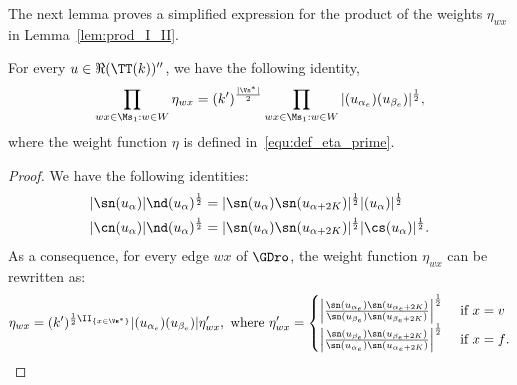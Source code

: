 \documentclass[a4paper,twoside,11pt]{article}
\begin{document}
The next lemma proves a simplified expression for the product of the weights $\eta_{w x}$ in Lemma~\ref{lem:prod_I_II}.
\begin{lem}\label{lem:simplified}
For every $u\in\Re(\TT(k))''$, we have the following identity,
\begin{equation*}
\prod_{wx\in\Ms_1:w\in W}\eta_{w x}=(k')^{\frac{|\Vs^*|}{2}}\prod_{wx\in\Ms_1:w\in W}|\sc(u_{\alpha_e})\sc(u_{\beta_e})|^{\frac{1}{2}},
\end{equation*}
where the weight function $\eta$ is defined in~\eqref{equ:def_eta_prime}.
\end{lem}
\begin{proof}
We have the following identities:
\begin{align*}
|\sn(u_{\alpha})|\nd(u_{\alpha})^{\frac{1}{2}}&=|\sn(u_{\alpha})\sn(u_{\alpha+2K})|^\frac{1}{2} |\sc(u_{\alpha})|^\frac{1}{2}\\
|\cn(u_{\alpha})|\nd(u_{\alpha})^{\frac{1}{2}}&=|\sn(u_{\alpha})\sn(u_{\alpha+2K})|^\frac{1}{2}|\cs(u_{\alpha})|^\frac{1}{2}.
\end{align*}
As a consequence, for every edge $wx$ of $\GDro$, the weight function $\eta_{w x}$ can be rewritten as:
\begin{equation*}
\eta_{wx}=(k')^{\frac{1}{2}\II_{\{x\in \Vs^*\}}}|\sc(u_{\alpha_e})\sc(u_{\beta_e})|\eta'_{w x}, 
\text{ where } \eta'_{w x}=
\begin{cases}
\left|\frac{\sn(u_{\alpha_e})\sn(u_{\alpha_e+2K})}{\sn(u_{\beta_e})\sn(u_{\beta_e+2K})}\right|^{\frac{1}{2}}&\text{ if $x=v$}\\
\left|\frac{\sn(u_{\beta_e})\sn(u_{\beta_e+2K})}{\sn(u_{\alpha_e})\sn(u_{\alpha_e+2K})}\right|^{\frac{1}{2}}&\text{ if $x=f$}.
\end{cases}
\end{equation*}


\end{proof}
\end{document}
